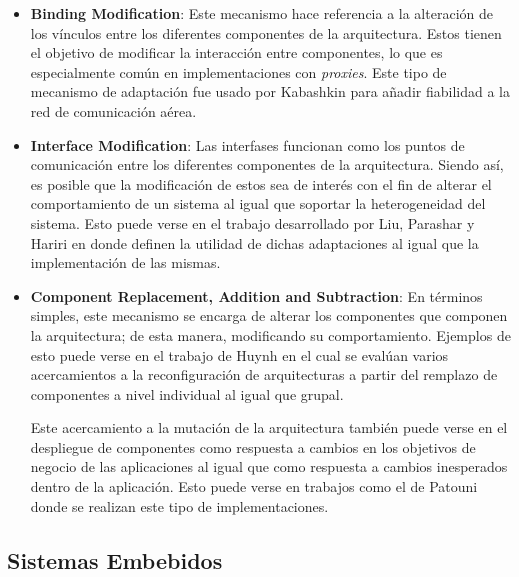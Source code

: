 \documentclass[12pt]{article}
\begin{document}
    \begin{itemize}
        \item \textbf{Binding Modification}: Este mecanismo hace referencia a la alteración de los vínculos entre los diferentes componentes de la arquitectura. Estos tienen el objetivo de modificar la interacción entre componentes, lo que es especialmente común en implementaciones con \textit{proxies}. Este tipo de mecanismo de adaptación fue usado por Kabashkin \citeyear{Kabashkin_2017} para añadir fiabilidad a la red de comunicación aérea.

        \item \textbf{Interface Modification}: Las interfases funcionan como los puntos de comunicación entre los diferentes componentes de la arquitectura. Siendo así, es posible que la modificación de estos sea de interés con el fin de alterar el comportamiento de un sistema al igual que soportar la heterogeneidad del sistema. Esto puede verse en el trabajo desarrollado por Liu, Parashar y Hariri \citeyear{Liu_2004} en donde definen la utilidad de dichas adaptaciones al igual que la implementación de las mismas.

        \item \textbf{Component Replacement, Addition and Subtraction}: En términos simples, este mecanismo se encarga de alterar los componentes que componen la arquitectura; de esta manera, modificando su comportamiento. Ejemplos de esto puede verse en el trabajo de Huynh \citeyear{Huynh_2019} en el cual se evalúan varios acercamientos a la reconfiguración de arquitecturas a partir del remplazo de componentes a nivel individual al igual que grupal. 
        
        Este acercamiento a la mutación de la arquitectura también puede verse en el despliegue de componentes como respuesta a cambios en los objetivos de negocio de las aplicaciones al igual que como respuesta a cambios inesperados dentro de la aplicación. Esto puede verse en trabajos como el de Patouni \citeyear{Patouni_2006} donde se realizan este tipo de implementaciones. %

    \end{itemize}

    \subsection{Sistemas Embebidos}
    
\end{document}

